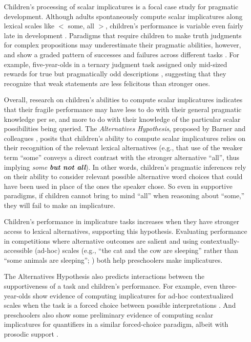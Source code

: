 \documentclass[10pt,letterpaper]{article}
\begin{document}
Children's processing of scalar implicatures is a focal case study for pragmatic development. Although adults spontaneously compute scalar implicatures along lexical scales like $<$ {\sc some, all} $>$, children's performance is variable even fairly late in development \citep{noveck2001}.  Paradigms that require children to make truth judgments for complex propositions may underestimate their pragmatic abilities, however, and show a graded pattern of successes and failures across different tasks \citep{guasti2005,papafragou2003, papafragou2004}. For example, five-year-olds in a ternary judgment task assigned only mid-sized rewards for true but pragmatically odd descriptions \citep{katsos2011}, suggesting that they recognize that weak statements are less felicitous than stronger ones.  

Overall, research on children's abilities to compute scalar implicatures indicates that their fragile performance may have less to do with their general pragmatic knowledge per se, and more to do with their knowledge of the particular scalar possibilities being queried. The \emph{Alternatives Hypothesis}, proposed by Barner and colleagues \citep{barner2010, barner2011}, posits that children's ability to compute scalar implicatures relies on their recognition of the relevant lexical alternatives (e.g., that use of the weaker term ``some'' conveys a direct contrast with the stronger alternative ``all'', thus implying \emph{some \textbf{but not all}}).  In other words, children's pragmatic inferences rely on their ability to consider relevant possible alternative word choices that could have been used in place of the ones the speaker chose. So even in supportive paradigms, if children cannot bring to mind ``all'' when reasoning about ``some,'' they will fail to make an implicature.

Children's performance in implicature tasks increases when they have stronger access to lexical alternatives, supporting this hypothesis.  Evaluating performance in competitions where alternative outcomes are salient \citep{papafragou2003} and using contextually-accessible (ad-hoc) scales (e.g., ``the cat and the cow are sleeping'' rather than ``some animals are sleeping''; \cite{barner2011}) both help preschoolers make implicatures. 

The Alternatives Hypothesis also predicts interactions between the supportiveness of a task and children's performance. For example, even three-year-olds show evidence of computing implicatures for ad-hoc contextualized scales when the task is a forced choice between possible interpretations \citep{stiller2014}. And preschoolers also show some preliminary evidence of computing scalar implicatures for quantifiers in a similar forced-choice paradigm, albeit with prosodic support \citep{miller2005}. 
\end{document}
